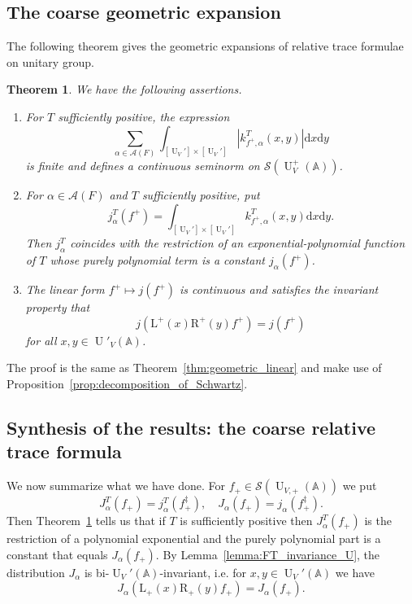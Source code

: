 \documentclass[letterpaper,11pt]{amsart}
\newcommand{\bA}{\mathbb{A}}
\newcommand{\cA}{\mathcal{A}}
\newcommand{\cS}{\mathcal{S}}
\newcommand{\rd}{\mathrm{d}}
\newcommand{\<}{\negthickspace}
\providecommand{\Abs}[1]{\left\lvert#1\right\rvert}
\DeclareMathOperator{\U}{U}
\theoremstyle{definition}
\theoremstyle{plain}
\newtheorem{theorem}[definition]{Theorem}
\theoremstyle{remark}
\numberwithin{equation}{section}
\begin{document}
\subsection{The coarse geometric expansion}

The following theorem gives the geometric expansions of relative trace formulae on
unitary group.

\begin{theorem} \label{thm:geometric_u}
We have the following assertions.
\begin{enumerate}
    \item For $T$ sufficiently positive, the expression
        \[
        \sum_{\alpha \in \cA(F)} \int_{[\U_V'] \times [\U_V']}
        \Abs{k_{f^+, \alpha}^T(x,y)} \rd x \rd y
        \]
        is finite and defines a continuous seminorm on
        $\cS(\U_V^+(\bA))$.

    \item For $\alpha \in \cA(F)$ and $T$ sufficiently positive, put
        \[
        j^T_\alpha(f^+) = \int_{[\U_V'] \times [\U_V']}
        k_{f^+, \alpha}^T(x,y) \rd x \rd y.
        \]
        Then $j^T_\alpha$ coincides with the restriction of an exponential-polynomial function of $T$
        whose purely polynomial term is a constant $j_\alpha(f^+)$.

    \item The linear form $f^+ \mapsto j(f^+)$ is continuous and satisfies
        the invariant property that
            \[
            j(\mathrm{L}^+(x)\mathrm{R}^+(y)f^+) = j(f^+)
            \]
        for all $x, y \in \U'_V(\bA)$.
\end{enumerate}
\end{theorem}

The proof is the same as Theorem~\ref{thm:geometric_linear} and make use of
Proposition~\ref{prop:decomposition_of_Schwartz}.




\subsection{Synthesis of the results: the coarse relative trace formula}
We now summarize what we have done. For $f_+ \in \cS(\U_{V,+}(\bA))$ we put
    \[
    J_{\alpha}^T(f_+) = j_{\alpha}^T(f_+^\ddag), \quad
    J_{\alpha}(f_+) = j_{\alpha}(f_+^\ddag).
    \]
Then Theorem~\ref{thm:geometric_u} tells us that if $T$ is sufficiently
positive then $J_{\alpha}^T(f_+)$ is the restriction of a polynomial
exponential and the purely polynomial part is a constant that equals
$J_{\alpha}(f_+)$. By Lemma~\ref{lemma:FT_invariance_U}, the distribution
$J_{\alpha}$ is bi-$\U_V'(\bA)$-invariant, i.e. for $x, y \in \U_V'(\bA)$
we have
    \[
    J_{\alpha}(\mathrm{L}_+(x) \mathrm{R}_+(y) f_+ )
    = J_{\alpha}(f_+).
    \]
\end{document}
